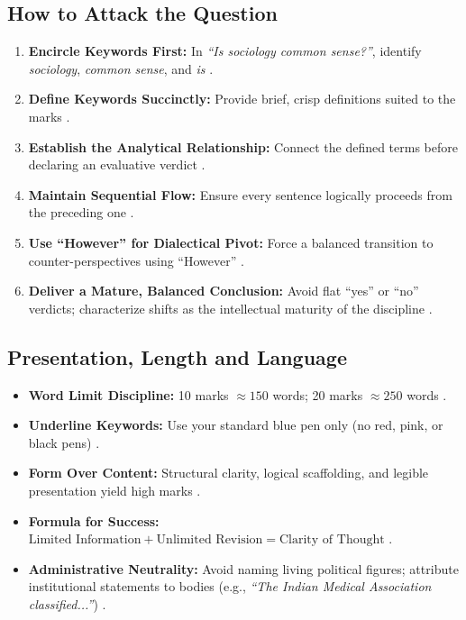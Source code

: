 \subsection{How to Attack the Question}
\begin{enumerate}
    \item \textbf{Encircle Keywords First:} In \textit{``Is sociology common sense?''}, identify \textit{sociology}, \textit{common sense}, and \textit{is} .
    \item \textbf{Define Keywords Succinctly:} Provide brief, crisp definitions suited to the marks .
    \item \textbf{Establish the Analytical Relationship:} Connect the defined terms before declaring an evaluative verdict .
    \item \textbf{Maintain Sequential Flow:} Ensure every sentence logically proceeds from the preceding one .
    \item \textbf{Use ``However'' for Dialectical Pivot:} Force a balanced transition to counter-perspectives using ``However'' .
    \item \textbf{Deliver a Mature, Balanced Conclusion:} Avoid flat ``yes'' or ``no'' verdicts; characterize shifts as the intellectual maturity of the discipline .
\end{enumerate}

\subsection{Presentation, Length and Language}
\begin{itemize}
    \item \textbf{Word Limit Discipline:} 10 marks $\approx 150$ words; 20 marks $\approx 250$ words .
    \item \textbf{Underline Keywords:} Use your standard blue pen only (no red, pink, or black pens) .
    \item \textbf{Form Over Content:} Structural clarity, logical scaffolding, and legible presentation yield high marks .
    \item \textbf{Formula for Success:} $\text{Limited Information} + \text{Unlimited Revision} = \text{Clarity of Thought}$ .
    \item \textbf{Administrative Neutrality:} Avoid naming living political figures; attribute institutional statements to bodies (e.g., \textit{``The Indian Medical Association classified...''}) .
\end{itemize}

